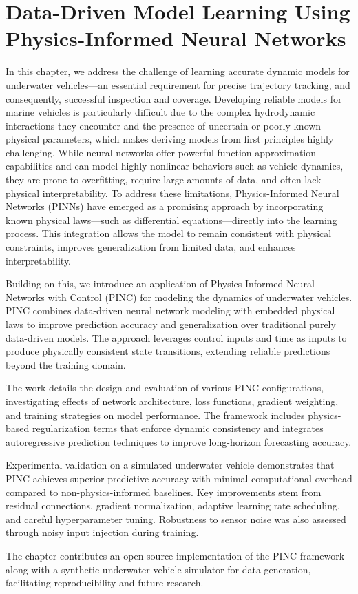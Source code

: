 \chapter{Data-Driven Model Learning Using Physics-Informed Neural Networks}
\label{ch:pinc}


In this chapter, we address the challenge of learning accurate dynamic models for underwater vehicles—an essential requirement for precise trajectory tracking, and consequently, successful inspection and coverage. Developing reliable models for marine vehicles is particularly difficult due to the complex hydrodynamic interactions they encounter and the presence of uncertain or poorly known physical parameters, which makes deriving models from first principles highly challenging. While neural networks offer powerful function approximation capabilities and can model highly nonlinear behaviors such as vehicle dynamics, they are prone to overfitting, require large amounts of data, and often lack physical interpretability. To address these limitations, Physics-Informed Neural Networks (PINNs) have emerged as a promising approach by incorporating known physical laws—such as differential equations—directly into the learning process. This integration allows the model to remain consistent with physical constraints, improves generalization from limited data, and enhances interpretability.

Building on this, we introduce an application of Physics-Informed Neural Networks with Control (PINC) for modeling the dynamics of underwater vehicles. PINC combines data-driven neural network modeling with embedded physical laws to improve prediction accuracy and generalization over traditional purely data-driven models. The approach leverages control inputs and time as inputs to produce physically consistent state transitions, extending reliable predictions beyond the training domain.

The work details the design and evaluation of various PINC configurations, investigating effects of network architecture, loss functions, gradient weighting, and training strategies on model performance. The framework includes physics-based regularization terms that enforce dynamic consistency and integrates autoregressive prediction techniques to improve long-horizon forecasting accuracy.

Experimental validation on a simulated underwater vehicle demonstrates that PINC achieves superior predictive accuracy with minimal computational overhead compared to non-physics-informed baselines. Key improvements stem from residual connections, gradient normalization, adaptive learning rate scheduling, and careful hyperparameter tuning. Robustness to sensor noise was also assessed through noisy input injection during training.

The chapter contributes an open-source implementation of the PINC framework along with a synthetic underwater vehicle simulator for data generation, facilitating reproducibility and future research.


